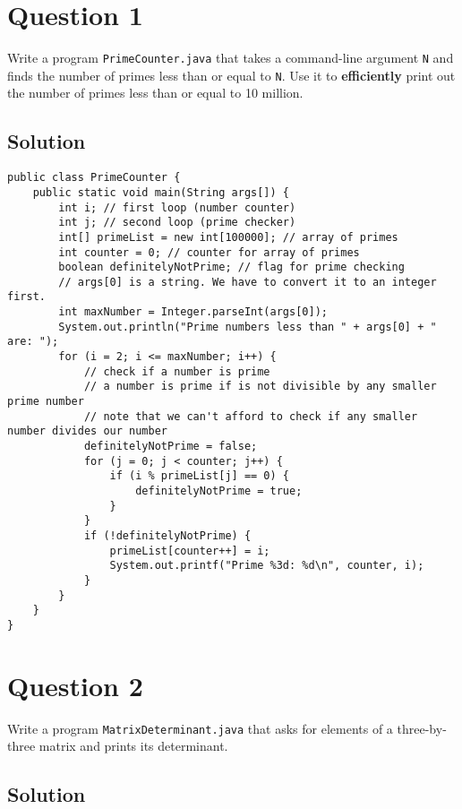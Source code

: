 \documentclass[12pt,letterpaper,twoside]{article}
\begin{document}


\section*{Question 1}

Write a program \texttt{PrimeCounter.java} that takes a command-line argument \texttt{N} and finds the number of primes less than or equal to \texttt{N}. Use it to \textbf{efficiently} print out the number of primes less than or equal to 10 million.

\subsection*{Solution}

\lstset{language=Java,tabsize=2}
\begin{lstlisting}
public class PrimeCounter {
	public static void main(String args[]) {
		int i; // first loop (number counter)
		int j; // second loop (prime checker)
		int[] primeList = new int[100000]; // array of primes
		int counter = 0; // counter for array of primes
		boolean definitelyNotPrime; // flag for prime checking
		// args[0] is a string. We have to convert it to an integer first.
		int maxNumber = Integer.parseInt(args[0]);
		System.out.println("Prime numbers less than " + args[0] + " are: ");
		for (i = 2; i <= maxNumber; i++) {
			// check if a number is prime
			// a number is prime if is not divisible by any smaller prime number
			// note that we can't afford to check if any smaller number divides our number
			definitelyNotPrime = false;
			for (j = 0; j < counter; j++) {
				if (i % primeList[j] == 0) {
					definitelyNotPrime = true;
				}
			}
			if (!definitelyNotPrime) {
				primeList[counter++] = i;
				System.out.printf("Prime %3d: %d\n", counter, i);
			}
		}
	}
}
\end{lstlisting}

\section*{Question 2}

Write a program \texttt{MatrixDeterminant.java} that asks for elements of a three-by-three matrix and prints its determinant.

\subsection*{Solution}
\end{document}
